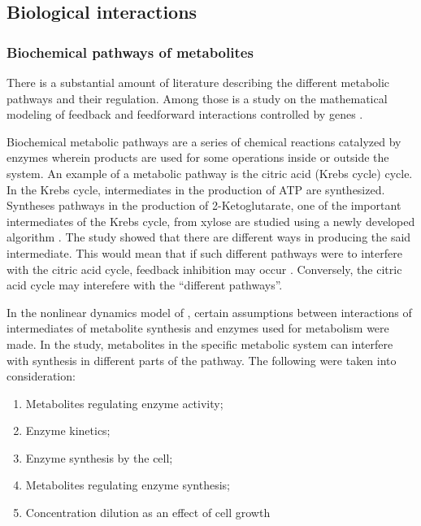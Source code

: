 \subsection{Biological interactions}
\subsubsection{Biochemical pathways of metabolites}

There is a substantial amount of literature describing the different metabolic pathways and their regulation.
Among those is a study on the mathematical modeling of feedback and feedforward interactions controlled by genes \cite{Chaves2019}.

Biochemical metabolic pathways are a series of chemical reactions catalyzed by enzymes wherein products are used for some operations inside or outside the system.
An example of a metabolic pathway is the citric acid (Krebs cycle) cycle.
In the Krebs cycle, intermediates in the production of ATP are synthesized.
Syntheses pathways in the production of 2-Ketoglutarate, one of the important intermediates of the Krebs cycle, from xylose are studied using a newly developed algorithm \cite{Gupta2018}.
The study showed that there are different ways in producing the said intermediate.
This would mean that if such different pathways were to interfere with the citric acid cycle, feedback inhibition may occur \cite{Chaves2019}.
Conversely, the citric acid cycle may interefere with the ``different pathways''.

In the nonlinear dynamics model of , certain assumptions between interactions of intermediates of metabolite synthesis and enzymes used for metabolism were made.
In the study, metabolites in the specific metabolic system can interfere with synthesis in different parts of the pathway.
The following were taken into consideration:

\begin{enumerate}
    \item Metabolites regulating enzyme activity;
    \item Enzyme kinetics;
    \item Enzyme synthesis by the cell;
    \item Metabolites regulating enzyme synthesis;
    \item Concentration dilution as an effect of cell growth
\end{enumerate}

